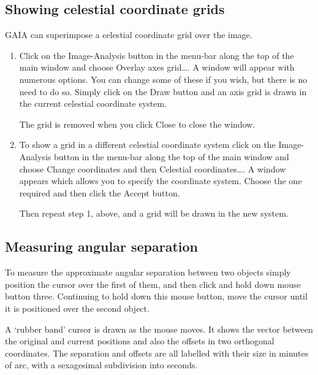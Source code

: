 \documentclass[twoside,11pt]{starlink}
\begin{document}
\subsection{Showing celestial coordinate grids}

GAIA can superimpose a celestial coordinate grid over the image.

\begin{enumerate}

  \item Click on the \textsf{Image-Analysis} button in the menu-bar along
   the top    of the main window and choose \textsf{Overlay axes grid\ldots}.
   A window will appear with numerous options.  You can change some of
   these if you wish, but there is no need to do so.  Simply click on the
   \textsf{Draw} button and an axis grid is drawn in the current celestial
   coordinate system.

   The grid is removed when you click \textsf{Close} to close the window.

  \item To show a grid in a different celestial coordinate system click
   on the \textsf{Image-Analysis} button in the menu-bar along the top
   of the main window and choose \textsf{Change coordinates} and then
   \textsf{Celestial coordinates\ldots}.  A window appears which allows you
   to specify the coordinate system.  Choose the one required and then
   click the \textsf{Accept} button.

   Then repeat step 1, above, and a grid will be drawn in the new system.

\end{enumerate}

\subsection{Measuring angular separation}

To measure the approximate angular separation between two objects simply
position the cursor over the first of them, and then click and hold down
mouse button three.  Continuing to hold down this mouse button, move the
cursor until it is positioned over the second object.

A `rubber band' cursor is drawn as the mouse moves.  It shows the vector
between the original and current positions and also the offsets in two
orthogonal coordinates.  The separation and offsets are all labelled with
their size in minutes of arc, with a sexagesimal subdivision into seconds.
\end{document}
